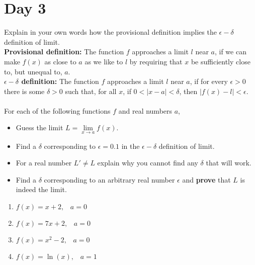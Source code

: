 \documentclass[11pt, a4paper, oneside]{amsart}
\begin{document}
\newpage\section*{Day 3}
\vspace{1em}

Explain in your own words how the provisional definition implies the $\epsilon-\delta$ definition of limit.\\


\textbf{Provisional definition:} The function $f$ approaches a limit $l$ near $a$, if we can make $f(x)$ as close to $a$ as we like to $l$ by requiring that $x$ be sufficiently close to, but unequal to, $a$.\\

\textbf{$\epsilon-\delta$ definition:} The function $f$ {approaches a limit} $l$ near $a$, if for every $\epsilon > 0$ there is some $\delta > 0$ such that, for all $x$, if $0 < |x - a| < \delta$, then $|f(x) - l| < \epsilon$.\\\\


For each of the following functions $f$ and real numbers $a$,
\begin{itemize}
	\item Guess the limit $L = \lim \limits _ {x \rightarrow a} f(x)$.
	\item Find a $\delta$ corresponding to $\epsilon = 0.1$ in the $\epsilon - \delta$ definition of limit.
	\item For a real number $L' \neq L$ explain why you cannot find any $\delta$ that will work.
	\item Find a $\delta$ corresponding to an arbitrary real number $\epsilon$ and \textbf{prove} that $L$ is indeed the limit.\\
\end{itemize}

\begin{enumerate}
	\item $f(x)=x+2, \hspace{10pt} a=0$
	\item $f(x)=7x+ 2, \hspace{10pt} a=0$
	\item $f(x)=x^2-2, \hspace{10pt} a=0$
	\item $f(x)=\ln(x), \hspace{10pt} a=1$
\end{enumerate}
\end{document}

